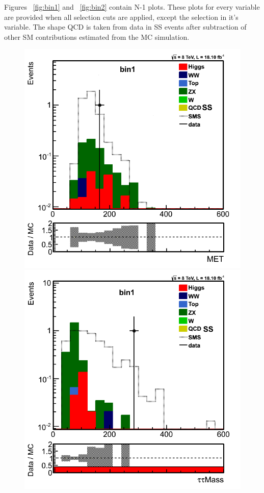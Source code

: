 Figures ~\ref{fig:bin1} and ~\ref{fig:bin2} contain N-1 plots. These plots for every variable are provided when all selection cuts are applied, except the selection in it's variable.
The shape QCD is taken from data in SS events after subtraction of other SM contributions
estimated from the MC simulation.

\begin{figure}[!Hhtb]
\centering
\includegraphics[angle=0,scale=0.35]{TauTauFigs/met_bin1_14nov.png}
\includegraphics[angle=0,scale=0.35]{TauTauFigs/zveto_bin1_14nov.png}

\end{figure}
